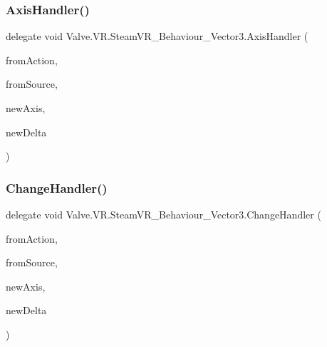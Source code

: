 \mbox{\label{class_valve_1_1_v_r_1_1_steam_v_r___behaviour___vector3_a6599185cabefcb861406669fdb78ce8a}} 
\subsubsection{\texorpdfstring{AxisHandler()}{AxisHandler()}}
{\footnotesize\ttfamily delegate void Valve.\+V\+R.\+Steam\+V\+R\+\_\+\+Behaviour\+\_\+\+Vector3.\+Axis\+Handler (\begin{DoxyParamCaption}\item[{\mbox{\hyperlink{class_valve_1_1_v_r_1_1_steam_v_r___behaviour___vector3}{Steam\+V\+R\+\_\+\+Behaviour\+\_\+\+Vector3}}}]{from\+Action,  }\item[{\mbox{\hyperlink{namespace_valve_1_1_v_r_a82e5bf501cc3aa155444ee3f0662853f}{Steam\+V\+R\+\_\+\+Input\+\_\+\+Sources}}}]{from\+Source,  }\item[{Vector3}]{new\+Axis,  }\item[{Vector3}]{new\+Delta }\end{DoxyParamCaption})}

\mbox{\label{class_valve_1_1_v_r_1_1_steam_v_r___behaviour___vector3_acbfc7493b7f3400ae86a1dc7a1d8eebd}} 
\subsubsection{\texorpdfstring{ChangeHandler()}{ChangeHandler()}}
{\footnotesize\ttfamily delegate void Valve.\+V\+R.\+Steam\+V\+R\+\_\+\+Behaviour\+\_\+\+Vector3.\+Change\+Handler (\begin{DoxyParamCaption}\item[{\mbox{\hyperlink{class_valve_1_1_v_r_1_1_steam_v_r___behaviour___vector3}{Steam\+V\+R\+\_\+\+Behaviour\+\_\+\+Vector3}}}]{from\+Action,  }\item[{\mbox{\hyperlink{namespace_valve_1_1_v_r_a82e5bf501cc3aa155444ee3f0662853f}{Steam\+V\+R\+\_\+\+Input\+\_\+\+Sources}}}]{from\+Source,  }\item[{Vector3}]{new\+Axis,  }\item[{Vector3}]{new\+Delta }\end{DoxyParamCaption})}

